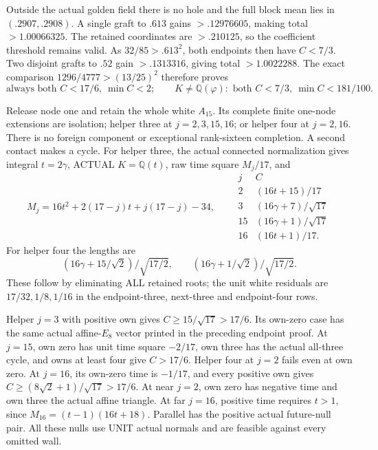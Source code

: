 Outside the actual golden field there is no hole and the
full block mean lies in \((.2907,.2908)\).
A single graft to \(.613\) gains \(>.12976605\), making total
\(>1.00066325\).
The retained coordinates are \(>.210125\), so the coefficient
threshold remains valid.
As \(32/85>.613^2\), both endpoints then have \(C<7/3\).
Two disjoint grafts to \(.52\) gain \(>.1313316\), giving total
\(>1.0022288\).
The exact comparison
\(1296/4777>(13/25)^2\) therefore proves
\[
 \text{always both }C<17/6,\ \min C<2;\qquad
 K\ne\mathbb Q(\varphi):
        \text{ both }C<7/3,\ \min C<181/100 .
\tag{A16lengths}\label{eq:arithA16lengths}
\]

Release node one and retain the whole white \(A_{15}\).
Its complete finite one-node extensions are isolation;
helper three at \(j=2,3,15,16\); or helper four at \(j=2,16\).
There is no foreign component or exceptional rank-sixteen
completion.  A second contact makes a cycle.
For helper three, the actual connected normalization gives
integral \(t=2\gamma\), ACTUAL \(K=\mathbb Q(t)\), raw
time square \(M_j/17\), and
\[
 M_j=16t^2+2(17-j)t+j(17-j)-34,\qquad
\begin{array}{c|c}
j&C\\ \hline
2&(16t+15)/17\\
3&(16\gamma+7)/\sqrt{17}\\
15&(16\gamma+1)/\sqrt{17}\\
16&(16t+1)/17 .
\end{array}
\]
For helper four the lengths are
\[
 (16\gamma+15/\sqrt2)/\sqrt{17/2},\qquad
 (16\gamma+1/\sqrt2)/\sqrt{17/2}.
\]
These follow by eliminating ALL retained roots; the unit white
residuals are \(17/32,1/8,1/16\) in the endpoint-three,
next-three and endpoint-four rows.

Helper \(j=3\) with positive own gives
\(C\ge15/\sqrt{17}>17/6\).
Its own-zero case has the same actual affine-\(E_8\) vector
printed in the preceding endpoint proof.
At \(j=15\), own zero has unit time square \(-2/17\), own three
has the actual all-three cycle, and owns at least four give
\(C>17/6\).
Helper four at \(j=2\) fails even at own zero.
At \(j=16\), its own-zero time is \(-1/17\), and every positive
own gives \(C\ge(8\sqrt2+1)/\sqrt{17}>17/6\).
At near \(j=2\), own zero has negative time and own three
the actual affine triangle.
At far \(j=16\), positive time requires \(t>1\), since
\(M_{16}=(t-1)(16t+18)\).
Parallel has the positive actual future-null pair.
All these nulls use UNIT actual normals and are feasible
against every omitted wall.


